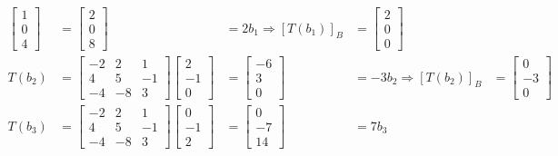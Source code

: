 \documentclass[a4paper, 9pt]{extarticle}
\begin{document}
\begin{examplebox}{}{}
$$\begin{aligned}
      \begin{bmatrix} 1 \\ 0 \\ 4 \end{bmatrix}
                                   & = \begin{bmatrix} 2 \\ 0 \\ 8 \end{bmatrix}                             & = 2b_{1}
      \Longrightarrow [T(b_{1})]_B & = \begin{bmatrix} 2 \\ 0 \\ 0 \end{bmatrix}                                         \\[1em]
      T(b_{2})                     & = \begin{bmatrix} -2 & 2 & 1 \\ 4 & 5 & -1 \\ -4 & -8 & 3 \end{bmatrix}
      \begin{bmatrix} 2 \\ -1 \\ 0 \end{bmatrix}
                                   & = \begin{bmatrix} -6 \\ 3 \\ 0 \end{bmatrix}                            & = -3b_{2}
      \Longrightarrow [T(b_{2})]_B & = \begin{bmatrix} 0 \\ -3 \\ 0 \end{bmatrix}                                        \\[1em]
      T(b_{3})                     & = \begin{bmatrix} -2 & 2 & 1 \\ 4 & 5 & -1 \\ -4 & -8 & 3 \end{bmatrix}
      \begin{bmatrix} 0 \\ -1 \\ 2 \end{bmatrix}
                                   & = \begin{bmatrix} 0 \\ -7 \\ 14 \end{bmatrix}                           & = 7b_{3}

\end{aligned}$$
\end{examplebox}
\end{document}
